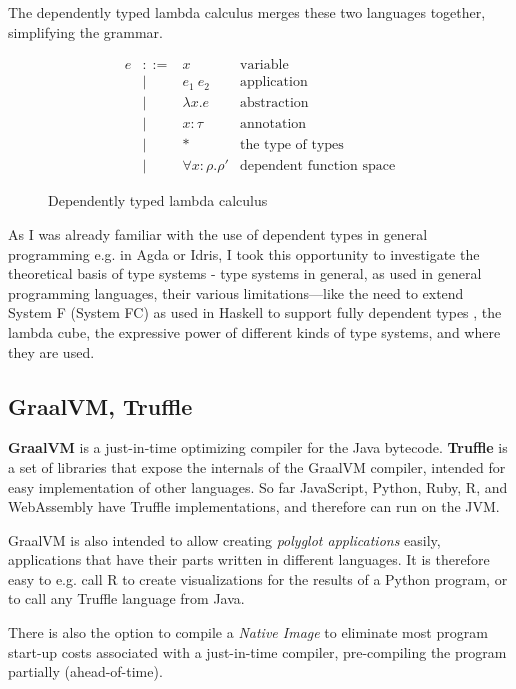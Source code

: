 \documentclass{SPFIT}
\begin{document}
The dependently typed lambda calculus merges these two languages together,
simplifying the grammar.

\begin{figure}[!htpb]
\[\begin{array}{ccll}
e & ::= & x           & \text{variable} \\
  & |   & e_1~e_2      & \text{application} \\
  & |   & \lambda x. e & \text{abstraction} \\
  & |   & x:\tau      & \text{annotation} \\
  & |   & *           & \text{the type of types} \\
  & |   & \forall x:\rho.\rho' & \text{dependent function space}
\end{array}\]
\caption{Dependently typed lambda calculus}
\end{figure}

As I was already familiar with the use of dependent types in general programming
e.g.  in Agda or Idris, I took this opportunity to investigate the theoretical
basis of type systems - type systems in general, as used in general programming
languages, their various limitations---like the need to extend System F (System
FC) as used in Haskell to support fully dependent types
\cite{eisenberg2016dependent}, the lambda cube, the expressive power of
different kinds of type systems, and where they are used.

\subsection{GraalVM, Truffle}
\label{sec:org5fac853}
\textbf{GraalVM} is a just-in-time optimizing compiler for the Java bytecode. \textbf{Truffle} is
a set of libraries that expose the internals of the GraalVM compiler, intended
for easy implementation of other languages. So far JavaScript, Python, Ruby, R,
and WebAssembly have Truffle implementations, and therefore can run on the JVM.

GraalVM is also intended to allow creating \emph{polyglot applications} easily,
applications that have their parts written in different languages. It is
therefore easy to e.g. call R to create visualizations for the results of a
Python program, or to call any Truffle language from Java.

There is also the option to compile a \emph{Native Image} to eliminate most program
start-up costs associated with a just-in-time compiler, pre-compiling the
program partially (ahead-of-time).
\end{document}
